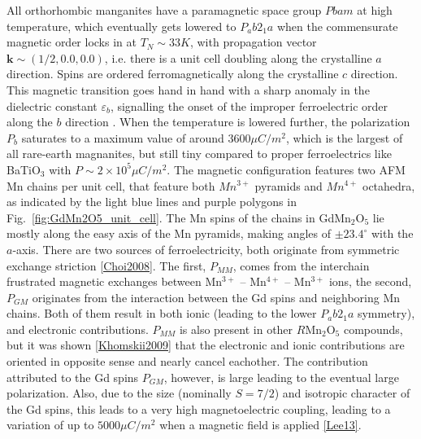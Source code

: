 All orthorhombic manganites have a paramagnetic space group $Pbam$ \cite{Alfonso97a} at high temperature, which eventually gets lowered to $P_ab2_1a$ when the commensurate magnetic order locks in at $T_{N} \sim 33K$, with propagation vector $\bm{k} \sim (1/2, 0.0, 0.0)$, i.e. there is a unit cell doubling along the crystalline $a$ direction. Spins are ordered ferromagnetically along the crystalline $c$ direction. This magnetic transition goes hand in hand with a sharp anomaly in the dielectric constant $\varepsilon_b$, signalling the onset of the improper ferroelectric order along the $b$ direction \cite{Lee13}.
When the temperature is lowered further, the polarization $P_b$ saturates to a maximum value of around $3600 \mu C/m^2$, which is the largest of all rare-earth magnanites, but still tiny compared to proper ferroelectrics like BaTiO$_3$ with $P \sim 2 \times 10^5 \mu C/m^2$.
The magnetic configuration features two AFM Mn chains per unit cell, that feature both $Mn^{3+}$ pyramids and $Mn^{4+}$ octahedra, as indicated by the light blue lines and purple polygons in Fig.~\ref{fig:GdMn2O5_unit_cell}. The Mn spins of the chains in GdMn$_2$O$_5$ lie mostly along the easy axis of the Mn pyramids, making angles of $\pm 23.4^\circ$ with the $a$-axis.
There are two sources of ferroelectricity, both originate from symmetric exchange striction \ref{Choi2008}. The first, $P_{MM}$, comes from the interchain frustrated magnetic exchanges between Mn$^{3+}$ -- Mn$^{4+}$ -- Mn$^{3+}$ ions, the second, $P_{GM}$ originates from the interaction between the Gd spins and neighboring Mn chains.
Both of them result in both ionic (leading to the lower $P_ab2_1a$ symmetry), and electronic contributions. $P_{MM}$ is also present in other $R$Mn$_2$O$_5$ compounds, but it was shown \ref{Khomskii2009} that the electronic and ionic contributions are oriented in opposite sense and nearly cancel eachother. The contribution attributed to the Gd spins $P_{GM}$, however, is large leading to the eventual large polarization. Also, due to the size (nominally $S=7/2$) and isotropic character of the Gd spins, this leads to a very high magnetoelectric coupling, leading to a variation of up to $5000 \mu C/m^2$ when a magnetic field is applied \ref{Lee13}. 

